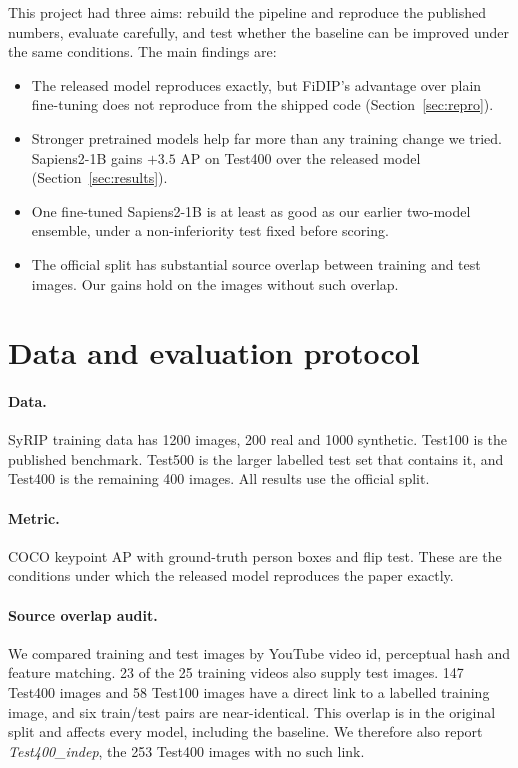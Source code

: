 \documentclass[11pt]{article}
\begin{document}
This project had three aims: rebuild the pipeline and reproduce the published numbers, evaluate carefully, and test whether the baseline can be improved under the same conditions. The main findings are:
\begin{itemize}
  \item The released model reproduces exactly, but FiDIP's advantage over plain fine-tuning does not reproduce from the shipped code (Section~\ref{sec:repro}).
  \item Stronger pretrained models help far more than any training change we tried. Sapiens2-1B gains $+3.5$ AP on Test400 over the released model (Section~\ref{sec:results}).
  \item One fine-tuned Sapiens2-1B is at least as good as our earlier two-model ensemble, under a non-inferiority test fixed before scoring.
  \item The official split has substantial source overlap between training and test images. Our gains hold on the images without such overlap.
\end{itemize}

\section{Data and evaluation protocol}
\label{sec:protocol}
\paragraph{Data.} SyRIP training data has 1200 images, 200 real and 1000 synthetic. Test100 is the published benchmark. Test500 is the larger labelled test set that contains it, and Test400 is the remaining 400 images. All results use the official split.

\paragraph{Metric.} COCO keypoint AP \cite{coco} with ground-truth person boxes and flip test. These are the conditions under which the released model reproduces the paper exactly.

\paragraph{Source overlap audit.} We compared training and test images by YouTube video id, perceptual hash and feature matching. 23 of the 25 training videos also supply test images. 147 Test400 images and 58 Test100 images have a direct link to a labelled training image, and six train/test pairs are near-identical. This overlap is in the original split and affects every model, including the baseline. We therefore also report \emph{Test400\_indep}, the 253 Test400 images with no such link.
\end{document}
